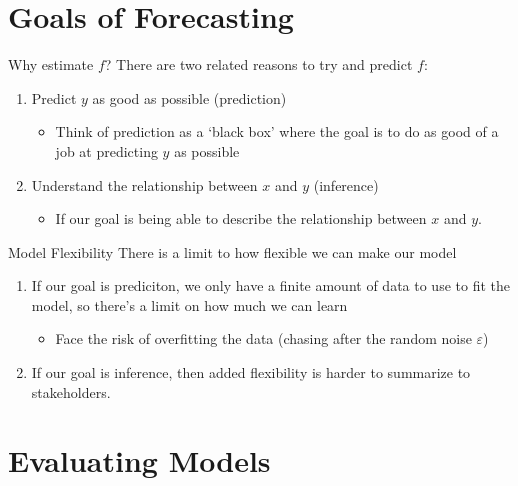 \documentclass[aspectratio=169,t,11pt,table]{beamer}
\begin{document}
\section{Goals of Forecasting}

\begin{frame}{Why estimate $f$?}
  There are two related reasons to try and predict $f$:
  \begin{enumerate}
    \item Predict $y$ as good as possible (\alert{prediction})
    \begin{itemize}
      \item Think of prediction as a `black box' where the goal is to do as good of a job at predicting $y$ as possible
    \end{itemize}
    
    \item Understand the relationship between $x$ and $y$ (\alert{inference})
    \begin{itemize}
      \item If our goal is being able to describe the relationship between $x$ and $y$.
    \end{itemize}
  \end{enumerate}
\end{frame}

\begin{frame}{Model Flexibility}
  There is a limit to how \alert{flexible} we can make our model
 
  \bigskip
  \begin{enumerate}
    \item If our goal is prediciton, we only have a finite amount of data to use to fit the model, so there's a limit on how much we can learn
    \begin{itemize}
      \item Face the risk of \alert{overfitting} the data (chasing after the random noise $\varepsilon$)
    \end{itemize}
   
   \item If our goal is inference, then added flexibility is harder to summarize to stakeholders.
  \end{enumerate}
\end{frame}



\section{Evaluating Models}
\end{document}

